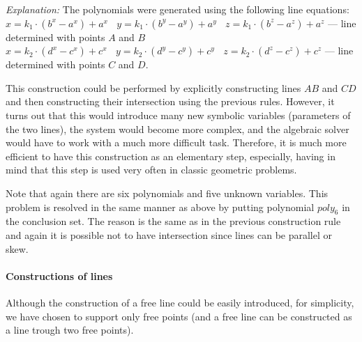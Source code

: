 \documentclass[final,1p,times,authoryear]{elsarticle}
\begin{document}
\begin{description}
{\em Explanation:} The polynomials were generated using the following
line equations: \\ $x = k_1\cdot (b^x - a^x) + a^x \ \ \ \ y =
k_1\cdot (b^y - a^y) + a^y \ \ \ \ z = k_1\cdot (b^z - a^z) + a^z$ ---
line determined with points $A$ and $B$ \\ $x = k_2\cdot (d^x - c^x) +
c^x \ \ \ \ y = k_2\cdot (d^y - c^y) + c^y \ \ \ \ z = k_2\cdot (d^z -
c^z) + c^z$ --- line determined with points $C$ and $D$.



This construction could be performed by explicitly constructing lines
$AB$ and $CD$ and then constructing their intersection using the
previous rules. However, it turns out that this would introduce many
new symbolic variables (parameters of the two lines), the system would
become more complex, and the algebraic solver would have to work with
a much more difficult task. Therefore, it is much more efficient to
have this construction as an elementary step, especially, having in
mind that this step is used very often in classic geometric problems. 

Note that again there are six polynomials and five unknown
variables. This problem is resolved in the same manner as above by
putting polynomial $poly_6$ in the conclusion set. The reason is the
same as in the previous construction rule and again it is possible not
to have intersection since lines can be parallel or skew.
\end{description}


\paragraph{Constructions of lines}
Although the construction of a free line could be easily introduced,
for simplicity, we have chosen to support only free points (and a free
line can be constructed as a line trough two free points).
\end{document}
